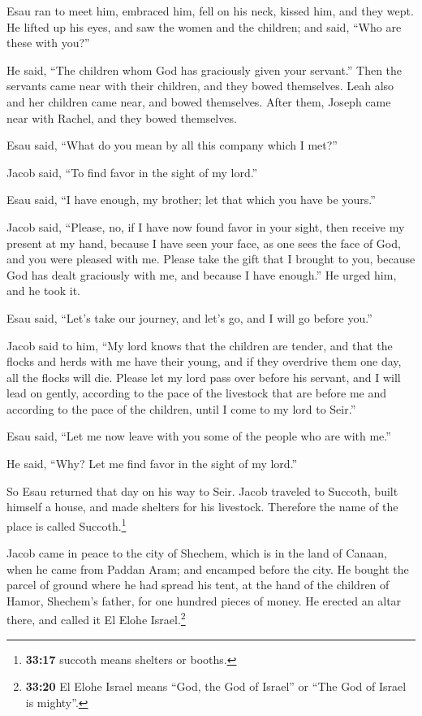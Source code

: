  Esau ran to meet him, embraced him, fell on his neck,
kissed him, and they wept.  He lifted up his eyes, and saw
the women and the children; and said, ``Who are these with you?''

He said, ``The children whom God has graciously given your servant.''
 Then the servants came near with their children, and they
bowed themselves.  Leah also and her children came near,
and bowed themselves. After them, Joseph came near with Rachel, and they
bowed themselves.

 Esau said, ``What do you mean by all this company which I
met?''

Jacob said, ``To find favor in the sight of my lord.''

 Esau said, ``I have enough, my brother; let that which
you have be yours.''

 Jacob said, ``Please, no, if I have now found favor in
your sight, then receive my present at my hand, because I have seen your
face, as one sees the face of God, and you were pleased with me.
 Please take the gift that I brought to you, because God
has dealt graciously with me, and because I have enough.'' He urged him,
and he took it.

 Esau said, ``Let's take our journey, and let's go, and I
will go before you.''

 Jacob said to him, ``My lord knows that the children are
tender, and that the flocks and herds with me have their young, and if
they overdrive them one day, all the flocks will die. 
Please let my lord pass over before his servant, and I will lead on
gently, according to the pace of the livestock that are before me and
according to the pace of the children, until I come to my lord to
Seir.''

 Esau said, ``Let me now leave with you some of the
people who are with me.''

He said, ``Why? Let me find favor in the sight of my lord.''

 So Esau returned that day on his way to Seir.
 Jacob traveled to Succoth, built himself a house, and
made shelters for his livestock. Therefore the name of the place is
called Succoth.\footnote{\textbf{33:17} succoth means shelters or
  booths.}

 Jacob came in peace to the city of Shechem, which is in
the land of Canaan, when he came from Paddan Aram; and encamped before
the city.  He bought the parcel of ground where he had
spread his tent, at the hand of the children of Hamor, Shechem's father,
for one hundred pieces of money.  He erected an altar
there, and called it El Elohe Israel.\footnote{\textbf{33:20} El Elohe
  Israel means ``God, the God of Israel'' or ``The God of Israel is
  mighty''.}

